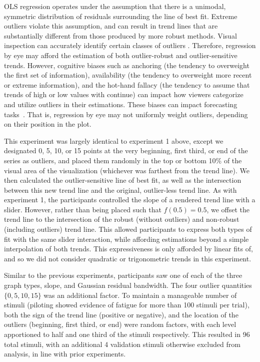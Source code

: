 \documentclass{sigchi}
\begin{document}
\outlierFig
OLS regression operates under the assumption that there is a unimodal, symmetric distribution of residuals surrounding the line of best fit. Extreme outliers violate this assumption, and can result in trend lines that are substantially different from those produced by more robust methods. Visual inspection can accurately identify certain classes of outliers \cite{albers2014task}. Therefore, regression by eye may afford the estimation of both outlier-robust and outlier-sensitive trends. However, cognitive biases such as anchoring (the tendency to overweight the first set of information), availability (the tendency to overweight more recent or extreme information), and the hot-hand fallacy (the tendency to assume that trends of high or low values with continue) can impact how viewers categorize and utilize outliers in their estimations. These biases can impact forecasting tasks~\cite{campbell2009anchoring,ji2001culture}. That is, regression by eye may not uniformly weight outliers, depending on their position in the plot.

This experiment was largely identical to experiment 1 above, except we designated 0, 5, 10, or 15 points at the very beginning, first third, or end of the series as outliers, and placed them randomly in the top or bottom 10\% of the visual area of the visualization (whichever was farthest from the trend line). We then calculated the outlier-sensitive line of best fit, as well as the intersection between this new trend line and the original, outlier-less trend line. As with experiment 1, the participants controlled the slope of a rendered trend line with a slider. However, rather than being placed such that $f(0.5)=0.5$, we offset the trend line to the intersection of the robust (without outliers) and non-robust (including outliers) trend line. This allowed participants to express both types of fit with the same slider interaction, while affording estimations beyond a simple interpolation of both trends. This expressiveness is only afforded by linear fits of, and so we did not consider quadratic or trigonometric trends in this experiment.

Similar to the previous experiments, participants saw one of each of the three graph types, slope, and Gaussian residual bandwidth. The four outlier quantities $\{0,5,10,15\}$ was an additional factor. To maintain a manageable number of stimuli (piloting showed evidence of fatigue for more than 100 stimuli per trial), both the sign of the trend line (positive or negative), and the location of the outliers (beginning, first third, or end) were random factors, with each level apportioned to half and one third of the stimuli respectively. This resulted in 96 total stimuli, with an additional 4 validation stimuli otherwise excluded from analysis, in line with prior experiments.
\end{document}
